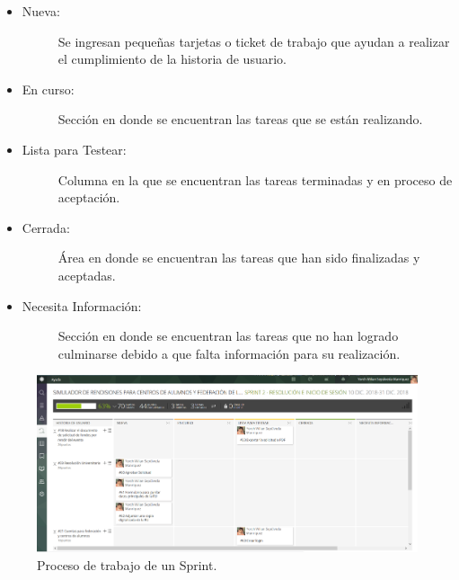 \begin{itemize}
    \item   \begin{description}
                \item[Nueva:] Se ingresan pequeñas tarjetas o ticket de trabajo que ayudan a realizar el cumplimiento de la historia de usuario.
            \end{description}

    \item   \begin{description}
                \item[En curso:] Sección en donde se encuentran las tareas que se están realizando.
            \end{description}

    \item   \begin{description}
                \item[Lista para Testear:] Columna en la que se encuentran las tareas terminadas y en proceso de aceptación.
            \end{description}

    \item   \begin{description}
                \item[Cerrada:] Área en donde se encuentran las tareas que han sido finalizadas y aceptadas.
            \end{description}
    
    \item   \begin{description}
                \item[Necesita Información:] Sección en donde se encuentran las tareas que no han logrado culminarse debido a que falta información para su realización.
            \end{description}
\end{itemize}

\begin{figure}[h!]
    \includegraphics[width=\textwidth]{Imagenes/Kanban.png}
    \caption{\label{fig: kanbanSprint} Proceso de trabajo de un Sprint.}
\end{figure}

